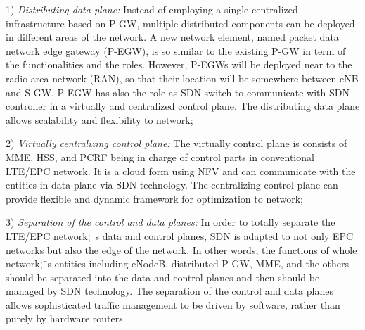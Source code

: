 \documentclass[runningheads,a4paper]{llncs}
\begin{document}
    1) \textit{Distributing data plane:} Instead of employing a single centralized infrastructure based on P-GW, multiple distributed components can be deployed in different areas of the network. A new network element, named packet data network edge gateway (P-EGW), is so similar to the existing P-GW in term of the functionalities and the roles. However, P-EGWs will be deployed near to the radio area network (RAN), so that their location will be somewhere between eNB and S-GW. P-EGW has also the role as SDN switch to communicate with SDN controller in a virtually and centralized control plane. The distributing data plane allows scalability and flexibility to network;

    2) \textit{Virtually centralizing control plane:} The virtually control plane is consists of MME, HSS, and PCRF being in charge of control parts in conventional LTE/EPC network. It is a cloud form using NFV and can communicate with the entities in data plane via SDN technology. The centralizing control plane can provide flexible and dynamic framework for optimization to network;

    3) \textit{Separation of the control and data planes:} In order to totally separate the LTE/EPC network¡¯s data and control planes, SDN is adapted to not only EPC networks but also the edge of the network. In other words, the functions of whole network¡¯s entities including eNodeB, distributed P-GW, MME, and the others should be separated into the data and control planes and then should be managed by SDN technology. The separation of the control and data planes allows sophisticated traffic management to be driven by software, rather than purely by hardware routers.
\end{document}
